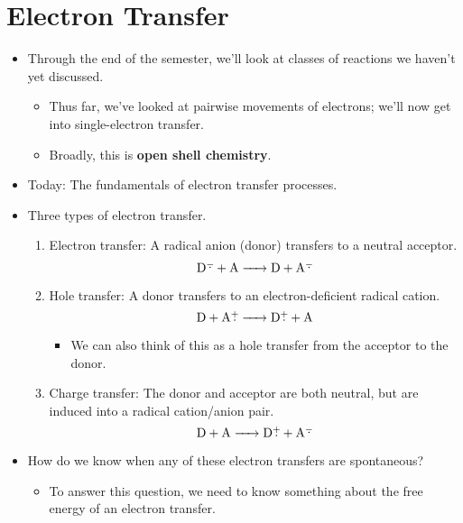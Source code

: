 \documentclass[../notes.tex]{subfiles}
\begin{document}
\section{Electron Transfer}
\begin{itemize}
    \item {}Through the end of the semester, we'll look at classes of reactions we haven't yet discussed.
    \begin{itemize}
        \item Thus far, we've looked at pairwise movements of electrons; we'll now get into single-electron transfer.
        \item Broadly, this is \textbf{open shell chemistry}.
    \end{itemize}
    \item Today: The fundamentals of electron transfer processes.
    \item Three types of electron transfer.
    \begin{enumerate}
        \item Electron transfer: A radical anion (donor) transfers to a neutral acceptor.
        \begin{equation*}
            \ce{D\ra{} + A -> D + A\ra}
        \end{equation*}
        \item Hole transfer: A donor transfers to an electron-deficient radical cation.
        \begin{equation*}
            \ce{D + A\rc{} -> D\rc{} + A}
        \end{equation*}
        \begin{itemize}
            \item We can also think of this as a hole transfer from the acceptor to the donor.
        \end{itemize}
        \item Charge transfer: The donor and acceptor are both neutral, but are induced into a radical cation/anion pair.
        \begin{equation*}
            \ce{D + A -> D\rc{} + A\ra}
        \end{equation*}
    \end{enumerate}
    \item How do we know when any of these electron transfers are spontaneous?
    \begin{itemize}
        \item To answer this question, we need to know something about the free energy of an electron transfer.

\end{itemize}
\end{itemize}
\end{document}
